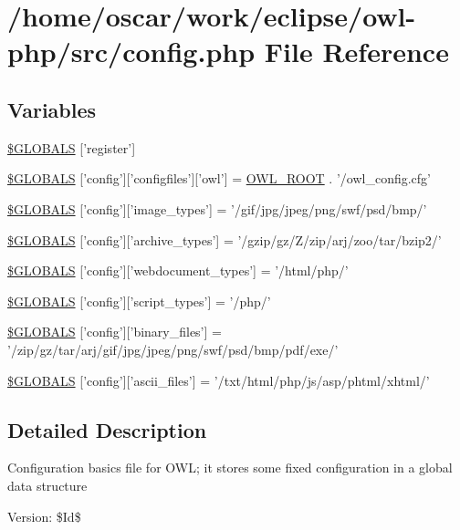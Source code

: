 \hypertarget{config_8php}{
\section{/home/oscar/work/eclipse/owl-php/src/config.php File Reference}
\label{config_8php}
}
\subsection*{Variables}
\begin{CompactItemize}
\item 
\hyperlink{config_8php_6cc1ef3a8c20d69988531d27f931855b}{\$GLOBALS} \mbox{[}'register'\mbox{]}
\item 
\hyperlink{config_8php_36e909583250c43d72bdc7c09e2d4a20}{\$GLOBALS} \mbox{[}'config'\mbox{]}\mbox{[}'configfiles'\mbox{]}\mbox{[}'owl'\mbox{]} = \hyperlink{index_8php_35612f9a6bd7277982731a74593272c4}{OWL\_\-ROOT} . '/owl\_\-config.cfg'
\item 
\hyperlink{config_8php_335a0ed5b0fc63ef47f9ba1d91e41dc6}{\$GLOBALS} \mbox{[}'config'\mbox{]}\mbox{[}'image\_\-types'\mbox{]} = '/gif/jpg/jpeg/png/swf/psd/bmp/'
\item 
\hyperlink{config_8php_93b1c5faba6a6e120b07b4206a619144}{\$GLOBALS} \mbox{[}'config'\mbox{]}\mbox{[}'archive\_\-types'\mbox{]} = '/gzip/gz/Z/zip/arj/zoo/tar/bzip2/'
\item 
\hyperlink{config_8php_bf54039b81f6214bcc39d4f399ad068f}{\$GLOBALS} \mbox{[}'config'\mbox{]}\mbox{[}'webdocument\_\-types'\mbox{]} = '/html/php/'
\item 
\hyperlink{config_8php_c4d548310cf87788e37150caed7d4092}{\$GLOBALS} \mbox{[}'config'\mbox{]}\mbox{[}'script\_\-types'\mbox{]} = '/php/'
\item 
\hyperlink{config_8php_0192eb81e0d90debab674415130b0884}{\$GLOBALS} \mbox{[}'config'\mbox{]}\mbox{[}'binary\_\-files'\mbox{]} = '/zip/gz/tar/arj/gif/jpg/jpeg/png/swf/psd/bmp/pdf/exe/'
\item 
\hyperlink{config_8php_feeb257c3edcf45093f5ffaccc3b8ee0}{\$GLOBALS} \mbox{[}'config'\mbox{]}\mbox{[}'ascii\_\-files'\mbox{]} = '/txt/html/php/js/asp/phtml/xhtml/'
\end{CompactItemize}


\subsection{Detailed Description}
Configuration basics file for OWL; it stores some fixed configuration in a global data structure \begin{Desc}
\item[Version:]\$Id\$ \end{Desc}


